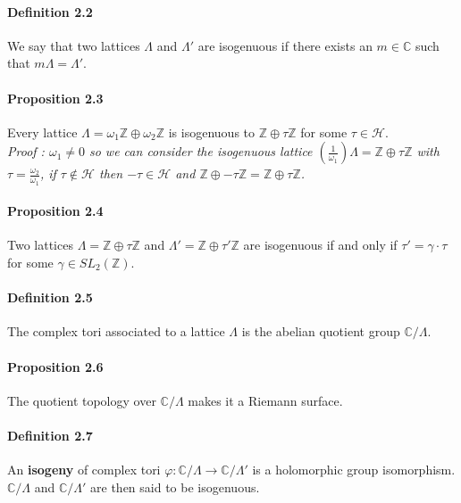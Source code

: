 \documentclass[letterpaper,10pt]{article}
\begin{document}
\paragraph{Definition 2.2} We say that two lattices $\Lambda$ and $\Lambda'$ are isogenuous if there exists an $m\in \mathbb{C}$ such that 
$m\Lambda = \Lambda'$.

\paragraph{Proposition 2.3} Every lattice $\Lambda = \omega_1\mathbb{Z} \oplus \omega_2\mathbb{Z}$ is isogenuous to  $\mathbb{Z} \oplus \tau\mathbb{Z}$ 
for some $\tau \in \mathcal{H}$.\\

{\itshape Proof : $\omega_1 \neq 0$ so we can consider the isogenuous lattice $(\frac{1}{\omega_1})\Lambda = \mathbb{Z} \oplus \tau\mathbb{Z}$ with 
$\tau = \frac{\omega_2}{\omega_1}$, if $\tau \notin \mathcal{H}$ then $-\tau \in \mathcal{H}$ and $\mathbb{Z} \oplus -\tau\mathbb{Z} = \mathbb{Z} \oplus \tau\mathbb{Z}$.
}
\paragraph{Proposition 2.4} Two lattices $\Lambda = \mathbb{Z} \oplus \tau\mathbb{Z}$ and $\Lambda' = \mathbb{Z} \oplus \tau'\mathbb{Z}$ are isogenuous if and only if
$\tau' = \gamma \cdot \tau$ for some $\gamma \in SL_2(\mathbb{Z})$.




\paragraph{Definition 2.5} The complex tori associated to a lattice $\Lambda$ is the abelian quotient group $\mathbb{C} / \Lambda$.  

\paragraph{Proposition 2.6} The quotient topology over $\mathbb{C} / \Lambda$ makes it a Riemann surface.

\paragraph{Definition 2.7} An \textbf{isogeny} of complex tori $\varphi : \mathbb{C} / \Lambda \to \mathbb{C} / \Lambda'$ is a holomorphic 
group isomorphism. $\mathbb{C} / \Lambda$ and $\mathbb{C} / \Lambda'$ are then said to be isogenuous.
\end{document}
